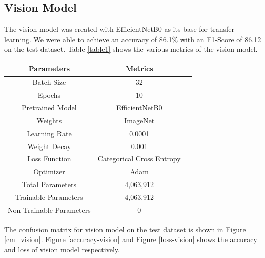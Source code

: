 \documentclass[fleqn, 10pt, twoside]{IOEGC}
\begin{document}
\subsection{Vision Model}
The vision model was created with EfficientNetB0 as its base for transfer learning. We were able to achieve an accuracy of 86.1\% with an F1-Score of 86.12 on the test dataset. Table \ref{table1} shows the various metrics of the vision model.
\begin{center}
	\begin{tabular}{ |c|c|c| }
		\hline
		\textbf{Parameters}      & \textbf{Metrics}          \\
		\hline
		Batch Size               & 32                        \\
		\hline
		Epochs                   & 10                        \\
		\hline
		Pretrained Model         & EfficientNetB0            \\
		\hline
		Weights                  & ImageNet                  \\
		\hline
		Learning Rate            & 0.0001                    \\
		\hline
		Weight Decay             & 0.001                     \\
		\hline
		Loss Function            & Categorical Cross Entropy \\
		\hline
		Optimizer                & Adam                      \\
		\hline
		Total Parameters         & 4,063,912                 \\
		\hline
		Trainable Parameters     & 4,063,912                 \\
		\hline
		Non-Trainable Parameters & 0                         \\
		\hline
	\end{tabular}
	\label{table1}

\end{center}

The confusion matrix for vision model on the test dataset is shown in Figure \ref{cm_vision}. Figure \ref{accuracy-vision} and Figure \ref{loss-vision} shows the accuracy and loss of vision model respectively.
\end{document}

